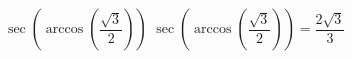  {$\sec\left(\arccos\left(\dfrac{\sqrt{3}}{2}\right)\right)$}
{ $\sec\left(\arccos\left(\dfrac{\sqrt{3}}{2}\right)\right) = \dfrac{2\sqrt{3}}{3}$}
